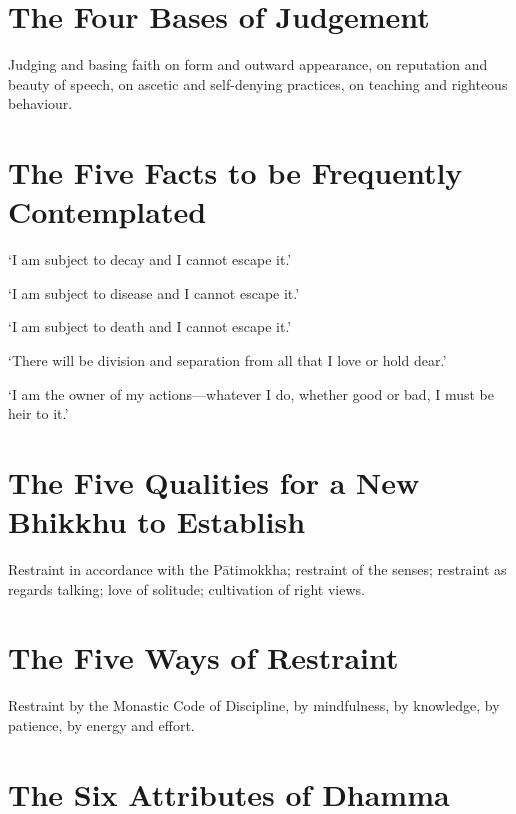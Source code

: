 
\section{The Four Bases of Judgement}

Judging and basing faith on form and outward appearance, on reputation and
beauty of speech, on ascetic and self-denying practices, on teaching and
righteous behaviour.


\section{The Five Facts to be Frequently Contemplated}

‘I am subject to decay and I cannot escape it.’

‘I am subject to disease and I cannot escape it.’

‘I am subject to death and I cannot escape it.’

‘There will be division and separation from all that I love or hold dear.’

‘I am the owner of my actions—whatever I do, whether good or bad, I must be heir
to it.’


\section{The Five Qualities for a New Bhikkhu to Establish}

Restraint in accordance with the Pātimokkha; restraint of the senses; restraint
as regards talking; love of solitude; cultivation of right views.


\section{The Five Ways of Restraint}

Restraint by the Monastic Code of Discipline, by mindfulness, by knowledge, by
patience, by energy and effort.


\section{The Six Attributes of Dhamma}

